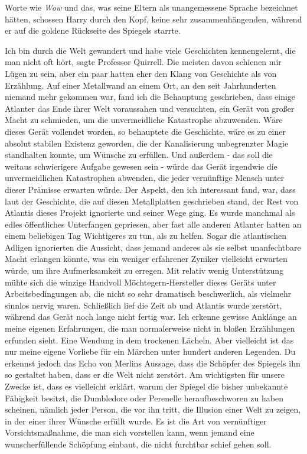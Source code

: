 Worte wie \glqq{}\emph{Wow}\grqq{} und das, was seine Eltern als unangemessene
Sprache bezeichnet hätten, schossen Harry durch den Kopf, keine sehr
zusammenhängenden, während er auf die goldene Rückseite des Spiegels starrte.

\glqq{}Ich bin durch die Welt gewandert und habe viele Geschichten kennengelernt,
die man nicht oft hört\grqq{}, sagte Professor Quirrell. \glqq{}Die meisten davon
schienen mir Lügen zu sein, aber ein paar hatten eher den Klang von Geschichte
als von Erzählung. Auf einer Metallwand an einem Ort, an den seit Jahrhunderten
niemand mehr gekommen war, fand ich die Behauptung geschrieben, dass einige
Atlanter das Ende ihrer Welt voraussahen und versuchten, ein Gerät von großer
Macht zu schmieden, um die unvermeidliche Katastrophe abzuwenden. Wäre dieses
Gerät vollendet worden, so behauptete die Geschichte, wäre es zu einer absolut
stabilen Existenz geworden, die der Kanalisierung unbegrenzter Magie standhalten
konnte, um Wünsche zu erfüllen. Und außerdem - das soll die weitaus schwierigere
Aufgabe gewesen sein - würde das Gerät irgendwie die unvermeidlichen
Katastrophen abwenden, die jeder vernünftige Mensch unter dieser Prämisse
erwarten würde. Der Aspekt, den ich interessant fand, war, dass laut der
Geschichte, die auf diesen Metallplatten geschrieben stand, der Rest von
Atlantis dieses Projekt ignorierte und seiner Wege ging. Es wurde manchmal als
edles öffentliches Unterfangen gepriesen, aber fast alle anderen Atlanter hatten
an einem beliebigen Tag Wichtigeres zu tun, als zu helfen. Sogar die
atlantischen Adligen ignorierten die Aussicht, dass jemand anderes als sie
selbst unanfechtbare Macht erlangen könnte, was ein weniger erfahrener Zyniker
vielleicht erwarten würde, um ihre Aufmerksamkeit zu erregen. Mit relativ wenig
Unterstützung mühte sich die winzige Handvoll Möchtegern-Hersteller dieses
Geräts unter Arbeitsbedingungen ab, die nicht so sehr dramatisch beschwerlich,
als vielmehr sinnlos nervig waren. Schließlich lief die Zeit ab und Atlantis
wurde zerstört, während das Gerät noch lange nicht fertig war. Ich erkenne
gewisse Anklänge an meine eigenen Erfahrungen, die man normalerweise nicht in
bloßen Erzählungen erfunden sieht.\grqq{} Eine Wendung in dem trockenen Lächeln.
\glqq{}Aber vielleicht ist das nur meine eigene Vorliebe für ein Märchen unter
hundert anderen Legenden. Du erkennst jedoch das Echo von Merlins Aussage, dass
die Schöpfer des Spiegels ihn so gestaltet haben, dass er die Welt nicht
zerstört. Am wichtigsten für unsere Zwecke ist, dass es vielleicht erklärt,
warum der Spiegel die bisher unbekannte Fähigkeit besitzt, die Dumbledore oder
Perenelle heraufbeschworen zu haben scheinen, nämlich jeder Person, die vor ihn
tritt, die Illusion einer Welt zu zeigen, in der einer ihrer Wünsche erfüllt
wurde. Es ist die Art von vernünftiger Vorsichtsmaßnahme, die man sich
vorstellen kann, wenn jemand eine wunscherfüllende Schöpfung einbaut, die nicht
furchtbar schief gehen soll.\grqq{}

